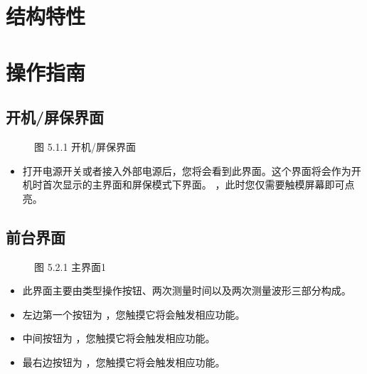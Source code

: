 \documentclass[a4paper,10pt,english]{sphinxmanual}
\begin{document}
\section{结构特性}
\label{\detokenize{structural_characteristics:id1}}\label{\detokenize{structural_characteristics::doc}}

\section{操作指南}
\label{\detokenize{operation_guide:id1}}\label{\detokenize{operation_guide::doc}}

\subsection{开机/屏保界面}
\label{\detokenize{operation_guide:id2}}
\begin{figure}[htbp]
\centering
\capstart

\noindent{}
\caption{图 5.1.1 开机/屏保界面}\label{\detokenize{operation_guide:id5}}\end{figure}
\begin{itemize}
\item {} 
\sphinxAtStartPar
打开电源开关或者接入外部电源后，您将会看到此界面。这个界面将会作为开机时首次显示的主界面和屏保模式下界面。
 ，此时您仅需要触模屏幕即可点亮。

\end{itemize}


\subsection{前台界面}
\label{\detokenize{operation_guide:id3}}
\begin{figure}[htbp]
\centering
\capstart

\noindent{}
\caption{图 5.2.1 主界面1}\label{\detokenize{operation_guide:id6}}\end{figure}
\begin{itemize}
\item {} 
\sphinxAtStartPar
此界面主要由类型操作按钮、两次测量时间以及两次测量波形三部分构成。

\item {} 
\sphinxAtStartPar
左边第一个按钮为  ，您触摸它将会触发相应功能。

\item {} 
\sphinxAtStartPar
中间按钮为 ，您触摸它将会触发相应功能。

\item {} 
\sphinxAtStartPar
最右边按钮为  ，您触摸它将会触发相应功能。

\end{itemize}
\end{document}
